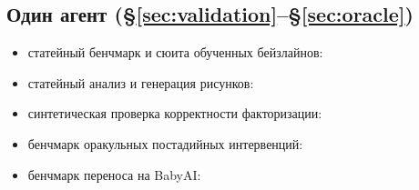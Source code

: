 \documentclass{article}
\begin{document}
\subsection*{Один агент (\S\ref{sec:validation}--\S\ref{sec:oracle})}
\begin{itemize}[leftmargin=16pt]
\item статейный бенчмарк и сюита обученных бейзлайнов: 
\item статейный анализ и генерация рисунков: 
\item синтетическая проверка корректности факторизации: 
\item бенчмарк оракульных постадийных интервенций: 
\item бенчмарк переноса на BabyAI: 
\end{itemize}
\end{document}
